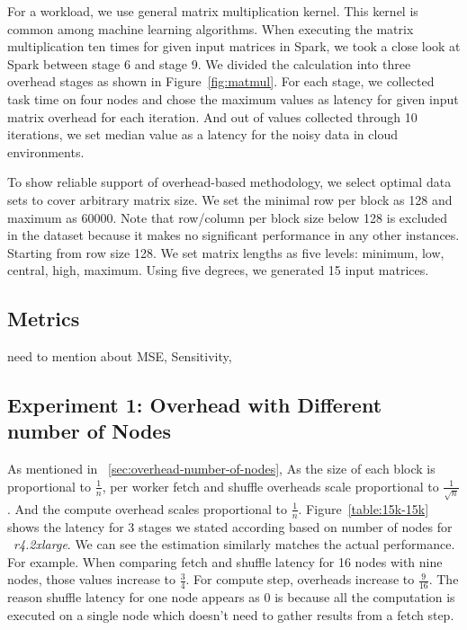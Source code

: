 \documentclass[10pt, conference, compsocconf]{IEEEtran}
\begin{document}
For a workload, we use general matrix multiplication kernel. This kernel is common among machine learning algorithms. When executing the matrix multiplication ten times for given input matrices in Spark, we took a close look at Spark between stage 6 and stage 9. We divided the calculation into three overhead stages as shown in Figure~\ref{fig:matmul}. For each stage, we collected task time on four nodes and chose the maximum values as latency for given input matrix overhead for each iteration. And out of values collected through 10 iterations, we set median value as a latency for the noisy data in cloud environments.

To show reliable support of overhead-based methodology, we select optimal data sets to cover arbitrary matrix size. We set the minimal row per block as 128 and maximum as 60000. Note that row/column per block size below 128 is excluded in the dataset because it makes no significant performance in any other instances. Starting from row size 128. We set matrix lengths as five levels: {minimum, low, central, high, maximum}. Using five degrees, we generated 15 input matrices. 

\subsection{Metrics}

need to mention about MSE, Sensitivity, 

\subsection{Experiment 1: Overhead with Different number of Nodes}

As mentioned in ~\ref{sec:overhead-number-of-nodes}, As the size of each block is proportional to $\frac{1}{n}$, per worker fetch and shuffle overheads scale proportional to $\frac{1}{\sqrt{n}}$. And the compute overhead scales proportional to $\frac{1}{n}$. Figure~\ref{table:15k-15k} shows the latency for 3 stages we stated according based on number of nodes for ~\textit{r4.2xlarge}. We can see the estimation similarly matches the actual performance. For example. When comparing fetch and shuffle latency for 16 nodes with nine nodes, those values increase to $\frac{3}{4}$.
For compute step, overheads increase to $\frac{9}{16}$. The reason shuffle latency for one node appears as $0$ is because all the computation is executed on a single node which doesn't need to gather results from a fetch step. 
\end{document}
